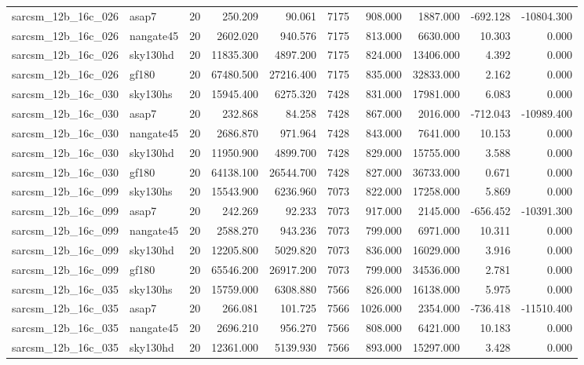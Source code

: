 \documentclass{article}
\begin{document}
\begin{longtable}{llrrrrrrrr}
sarcsm\_12b\_16c\_026 & asap7 & 20 & 250.209 & 90.061 & 7175 & 908.000 & 1887.000 & -692.128 & -10804.300 \\
sarcsm\_12b\_16c\_026 & nangate45 & 20 & 2602.020 & 940.576 & 7175 & 813.000 & 6630.000 & 10.303 & 0.000 \\
sarcsm\_12b\_16c\_026 & sky130hd & 20 & 11835.300 & 4897.200 & 7175 & 824.000 & 13406.000 & 4.392 & 0.000 \\
sarcsm\_12b\_16c\_026 & gf180 & 20 & 67480.500 & 27216.400 & 7175 & 835.000 & 32833.000 & 2.162 & 0.000 \\
sarcsm\_12b\_16c\_030 & sky130hs & 20 & 15945.400 & 6275.320 & 7428 & 831.000 & 17981.000 & 6.083 & 0.000 \\
sarcsm\_12b\_16c\_030 & asap7 & 20 & 232.868 & 84.258 & 7428 & 867.000 & 2016.000 & -712.043 & -10989.400 \\
sarcsm\_12b\_16c\_030 & nangate45 & 20 & 2686.870 & 971.964 & 7428 & 843.000 & 7641.000 & 10.153 & 0.000 \\
sarcsm\_12b\_16c\_030 & sky130hd & 20 & 11950.900 & 4899.700 & 7428 & 829.000 & 15755.000 & 3.588 & 0.000 \\
sarcsm\_12b\_16c\_030 & gf180 & 20 & 64138.100 & 26544.700 & 7428 & 827.000 & 36733.000 & 0.671 & 0.000 \\
sarcsm\_12b\_16c\_099 & sky130hs & 20 & 15543.900 & 6236.960 & 7073 & 822.000 & 17258.000 & 5.869 & 0.000 \\
sarcsm\_12b\_16c\_099 & asap7 & 20 & 242.269 & 92.233 & 7073 & 917.000 & 2145.000 & -656.452 & -10391.300 \\
sarcsm\_12b\_16c\_099 & nangate45 & 20 & 2588.270 & 943.236 & 7073 & 799.000 & 6971.000 & 10.311 & 0.000 \\
sarcsm\_12b\_16c\_099 & sky130hd & 20 & 12205.800 & 5029.820 & 7073 & 836.000 & 16029.000 & 3.916 & 0.000 \\
sarcsm\_12b\_16c\_099 & gf180 & 20 & 65546.200 & 26917.200 & 7073 & 799.000 & 34536.000 & 2.781 & 0.000 \\
sarcsm\_12b\_16c\_035 & sky130hs & 20 & 15759.000 & 6308.880 & 7566 & 826.000 & 16138.000 & 5.975 & 0.000 \\
sarcsm\_12b\_16c\_035 & asap7 & 20 & 266.081 & 101.725 & 7566 & 1026.000 & 2354.000 & -736.418 & -11510.400 \\
sarcsm\_12b\_16c\_035 & nangate45 & 20 & 2696.210 & 956.270 & 7566 & 808.000 & 6421.000 & 10.183 & 0.000 \\
sarcsm\_12b\_16c\_035 & sky130hd & 20 & 12361.000 & 5139.930 & 7566 & 893.000 & 15297.000 & 3.428 & 0.000 \\

\end{longtable}
\end{document}
